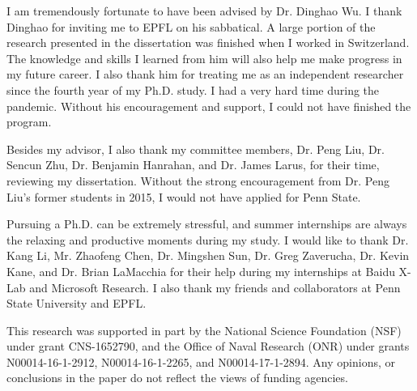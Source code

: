 I am tremendously fortunate to have been advised by Dr. Dinghao Wu.  I thank Dinghao for inviting me to EPFL on his sabbatical. A large portion of the research presented in the dissertation was finished when I worked in Switzerland. The knowledge and skills I learned from him will also help me make progress in my future career. I also thank him for treating me as an independent researcher since the fourth year of my Ph.D. study. I had a very hard time during the pandemic. Without his encouragement and support, I could not have finished the program.

Besides my advisor, I also thank my committee members, Dr. Peng Liu, Dr. Sencun Zhu, Dr. Benjamin Hanrahan, and Dr. James Larus, for their time, reviewing my dissertation. Without the strong encouragement from Dr. Peng Liu's former students in 2015, I would not have applied for Penn State.

Pursuing a Ph.D. can be extremely stressful, and summer internships are always the relaxing and productive moments during my study. I would like to thank Dr. Kang Li, Mr. Zhaofeng Chen, Dr. Mingshen Sun, Dr. Greg Zaverucha, Dr. Kevin Kane, and Dr. Brian LaMacchia for their help during my internships at Baidu X-Lab and Microsoft Research.  I also thank my friends and collaborators at Penn State University and EPFL. 

This research was supported in part by the National Science Foundation (NSF) under grant CNS-1652790, and the Office of Naval Research (ONR) under grants N00014-16-1-2912, N00014-16-1-2265, and N00014-17-1-2894. Any opinions, or conclusions in the paper do not reflect the views of funding agencies.

